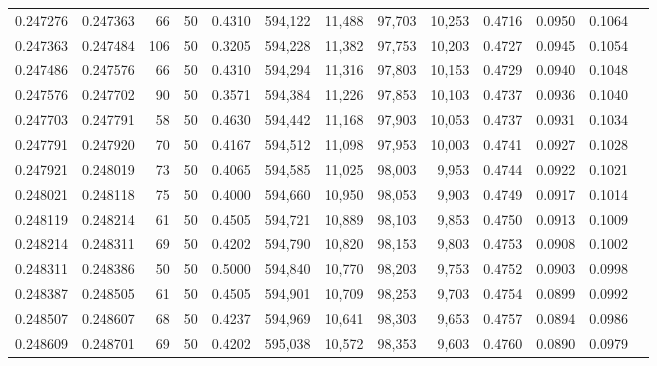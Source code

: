 \begin{tabular}{rrrrrrrrrrrrr}
0.247276 & 0.247363 &    66 &  50 &                                     0.4310 & 594,122 &  11,488 &  97,703 &  10,253 & 0.4716 & 0.0950 & 0.1064 \\
0.247363 & 0.247484 &   106 &  50 &                                     0.3205 & 594,228 &  11,382 &  97,753 &  10,203 & 0.4727 & 0.0945 & 0.1054 \\
0.247486 & 0.247576 &    66 &  50 &                                     0.4310 & 594,294 &  11,316 &  97,803 &  10,153 & 0.4729 & 0.0940 & 0.1048 \\
0.247576 & 0.247702 &    90 &  50 &                                     0.3571 & 594,384 &  11,226 &  97,853 &  10,103 & 0.4737 & 0.0936 & 0.1040 \\
0.247703 & 0.247791 &    58 &  50 &                                     0.4630 & 594,442 &  11,168 &  97,903 &  10,053 & 0.4737 & 0.0931 & 0.1034 \\
0.247791 & 0.247920 &    70 &  50 &                                     0.4167 & 594,512 &  11,098 &  97,953 &  10,003 & 0.4741 & 0.0927 & 0.1028 \\
0.247921 & 0.248019 &    73 &  50 &                                     0.4065 & 594,585 &  11,025 &  98,003 &   9,953 & 0.4744 & 0.0922 & 0.1021 \\
0.248021 & 0.248118 &    75 &  50 &                                     0.4000 & 594,660 &  10,950 &  98,053 &   9,903 & 0.4749 & 0.0917 & 0.1014 \\
0.248119 & 0.248214 &    61 &  50 &                                     0.4505 & 594,721 &  10,889 &  98,103 &   9,853 & 0.4750 & 0.0913 & 0.1009 \\
0.248214 & 0.248311 &    69 &  50 &                                     0.4202 & 594,790 &  10,820 &  98,153 &   9,803 & 0.4753 & 0.0908 & 0.1002 \\
0.248311 & 0.248386 &    50 &  50 &                                     0.5000 & 594,840 &  10,770 &  98,203 &   9,753 & 0.4752 & 0.0903 & 0.0998 \\
0.248387 & 0.248505 &    61 &  50 &                                     0.4505 & 594,901 &  10,709 &  98,253 &   9,703 & 0.4754 & 0.0899 & 0.0992 \\
0.248507 & 0.248607 &    68 &  50 &                                     0.4237 & 594,969 &  10,641 &  98,303 &   9,653 & 0.4757 & 0.0894 & 0.0986 \\
0.248609 & 0.248701 &    69 &  50 &                                     0.4202 & 595,038 &  10,572 &  98,353 &   9,603 & 0.4760 & 0.0890 & 0.0979 \\

\end{tabular}
